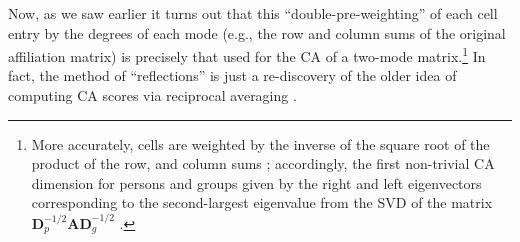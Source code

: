 \documentclass[a4paper,fleqn]{cas-sc}
\begin{document}
Now, as we saw earlier \citep[e.g.,][]{faust2005using} it turns out that this ``double-pre-weighting'' of each cell entry by the degrees of each mode (e.g., the row and column sums of the original affiliation matrix) is precisely that used for the CA of a two-mode matrix.\footnote{More accurately, cells are weighted by the inverse of the square root of the product of the row, and column sums \citep[e.g.,][124]{faust2005using}; accordingly, the first non-trivial CA dimension for persons and groups given by the right and left eigenvectors corresponding to the second-largest eigenvalue from the SVD of the matrix $\mathbf{D}_p^{-1/2}\mathbf{A}\mathbf{D}_g^{-1/2}$ \citep[126]{faust2005using}.} In fact, the method of ``reflections'' is just a re-discovery of the older idea of computing CA scores via reciprocal averaging \citep{hill1973reciprocal} \citep{mealy2019interpreting}.
\end{document}
